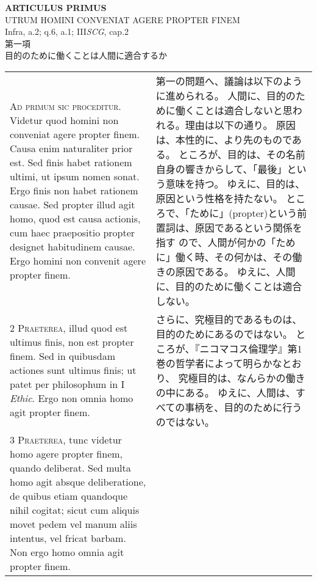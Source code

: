 \documentclass[10pt]{jsarticle} %
\begin{document}
\newpage
{}
\begin{center}
 {\Large {\bf ARTICULUS PRIMUS}}\\
 {\large UTRUM HOMINI CONVENIAT AGERE PROPTER FINEM}\\
 {\footnotesize Infra, a.2; q.6, a.1; III{\itshape SCG}, cap.2}\\
 {\Large 第一項\\目的のために働くことは人間に適合するか}
\end{center}

\begin{longtable}{p{21em}p{21em}}


{\Huge A}{\scshape d primum sic proceditur}. Videtur quod
homini non conveniat agere propter finem. Causa enim naturaliter prior
est. Sed finis habet rationem ultimi, ut ipsum nomen sonat. Ergo finis
non habet rationem causae. Sed propter illud agit homo, quod est causa
actionis, cum haec praepositio propter designet habitudinem causae. Ergo
homini non convenit agere propter finem.

&

第一の問題へ、議論は以下のように進められる。
人間に、目的のために働くことは適合しないと思われる。理由は以下の通り。
原因は、本性的に、より先のものである。
ところが、目的は、その名前自身の響きからして、「最後」という意味を持つ。
ゆえに、目的は、原因という性格を持たない。
ところで、「ために」(propter)という前置詞は、原因であるという関係を指す
 ので、人間が何かの「ために」働く時、その何かは、その働きの原因である。
ゆえに、人間に、目的のために働くことは適合しない。


\\


{\scshape 2 Praeterea}, illud quod est ultimus
finis, non est propter finem. Sed in quibusdam actiones sunt ultimus
finis; ut patet per philosophum in I {\itshape Ethic}. Ergo non omnia homo agit
propter finem.

&

さらに、究極目的であるものは、目的のためにあるのではない。
ところが、『ニコマコス倫理学』第1巻の哲学者によって明らかなとおり、
究極目的は、なんらかの働きの中にある。
ゆえに、人間は、すべての事柄を、目的のために行うのではない。



\\


{\scshape 3 Praeterea}, tunc videtur homo agere
propter finem, quando deliberat. Sed multa homo agit absque
deliberatione, de quibus etiam quandoque nihil cogitat; sicut cum
aliquis movet pedem vel manum aliis intentus, vel fricat barbam. Non
ergo homo omnia agit propter finem.


\end{longtable}
\end{document}
